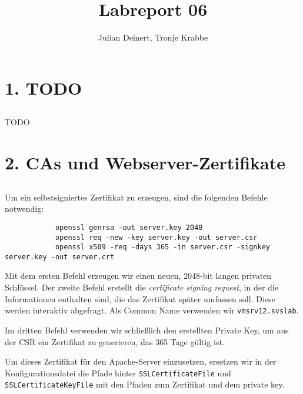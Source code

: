 \documentclass[10pt,a4paper]{article}
\author{Julian Deinert, Tronje Krabbe}
\title{Labreport 06}
\begin{document}
\maketitle
\tableofcontents
\thispagestyle{empty}
\newpage
\setcounter{page}{1}


\section*{1. TODO}
\setcounter{subsection}{1}

\subsection{}
TODO

\setcounter{section}{2}
\section*{2. CAs und Webserver-Zertifikate}
\setcounter{subsection}{1}
\subsection{}
        Um ein selbstsigniertes Zertifikat zu erzeugen, sind die folgenden Befehle notwendig:

        \begin{verbatim}
			openssl genrsa -out server.key 2048
			openssl req -new -key server.key -out server.csr
			openssl x509 -req -days 365 -in server.csr -signkey server.key -out server.crt
        \end{verbatim}

        Mit dem ersten Befehl erzeugen wir einen neuen, 
        2048-bit langen privaten
        Schlüssel. 
        Der zweite Befehl erstellt die
        \textit{certificate signing request}, 
        in der die Informationen enthalten
        sind, die das Zertifikat später umfassen soll. 
        Diese werden interaktiv
        abgefragt. 
        Als Common Name verwenden wir \texttt{vmsrv12.svslab}.

        Im dritten Befehl verwenden wir schließlich 
        den erstellten Private Key,
        um aus der CSR ein Zertifikat zu generieren, 
        das 365 Tage gültig ist.

        Um dieses Zertifikat für den Apache-Server einzusetzen, ersetzen wir in
        der Konfigurationsdatei die Pfade hinter \texttt{SSLCertificateFile} und
        \texttt{SSLCertificateKeyFile} mit den Pfaden zum Zertifikat und dem
        private key.
\end{document}
